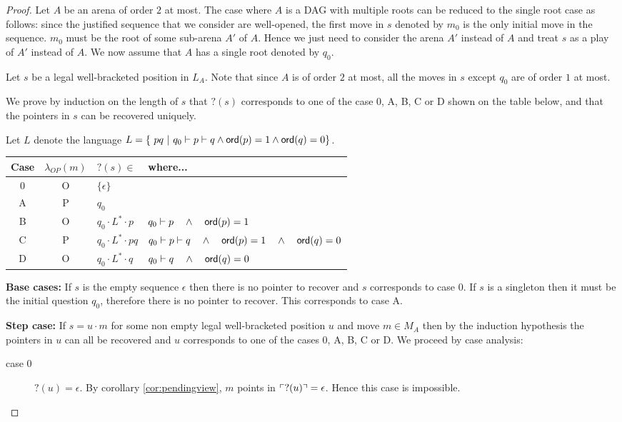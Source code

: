 \begin{proof}
Let $A$ be an arena of order $2$ at most.
The case where $A$ is a DAG with multiple roots can be reduced to the single root case as follows:
since the justified sequence that we consider are well-opened, the first move in $s$ denoted by $m_0$ is the only initial move in the sequence.
$m_0$ must be the root of some sub-arena $A'$ of $A$. Hence we just need to consider the arena $A'$ instead of $A$ and treat $s$ as a play
of $A'$ instead of $A$. We now assume that $A$ has a single root denoted by $q_0$.

Let $s$ be a legal well-bracketed position in $L_A$.
Note that since $A$ is of order $2$ at most, all the moves in $s$ except $q_0$ are of order $1$ at most.

We prove by induction on the length of $s$ that $?(s)$
corresponds to one of the case 0, A, B, C or D shown on the table below, and that the pointers in
$s$ can be recovered uniquely.

Let $L$ denote the language $L = \{\ p q \ | \ q_0 \vdash p \vdash q
\wedge {\sf ord}(p)=1 \wedge {\sf ord}(q) = 0 \}$.
\begin{center}
\begin{tabular}{c|c|l|l}
Case & $\lambda_{OP}(m)$ & $?(s) \in$ & where... \\ \hline
0 & O & $\{ \epsilon \}$ \\
A & P & $q_0$ \\
B & O & $q_0 \cdot L^* \cdot p$     & $q_0 \vdash p \quad \wedge\quad  {\sf ord}(p)=1$ \\ %
C & P & $q_0 \cdot L^* \cdot p q$ & $q_0 \vdash p \vdash q \quad \wedge\quad  {\sf ord}(p)=1 \quad \wedge\quad  {\sf ord}(q) = 0$ \\ %
D & O & $q_0 \cdot L^* \cdot q$      & $q_0 \vdash q \quad \wedge\quad  {\sf ord}(q) = 0$ \\ %
\end{tabular}
\end{center}


\noindent \textbf{Base cases:}
If $s$ is the empty sequence $\epsilon$ then there is no pointer to
recover and $s$ corresponds to case 0.
If $s$ is a singleton then it must be the initial question $q_0$, therefore
there is no pointer to recover. This corresponds to case A.

\noindent \textbf{Step case:}
If $s = u \cdot m$ for some non empty legal well-bracketed position $u$ and move $m \in M_A$
then by the induction hypothesis the pointers in $u$ can all be recovered and $u$ corresponds to one of the
cases 0, A, B, C or D.
We proceed by case analysis:
\begin{description}
\item[case 0] $?(u) = \epsilon$. By corollary \ref{cor:pendingview}, $m$ points in $\ulcorner ?(u) \urcorner = \epsilon$.
                Hence this case is impossible.


\end{description}
\end{proof}
